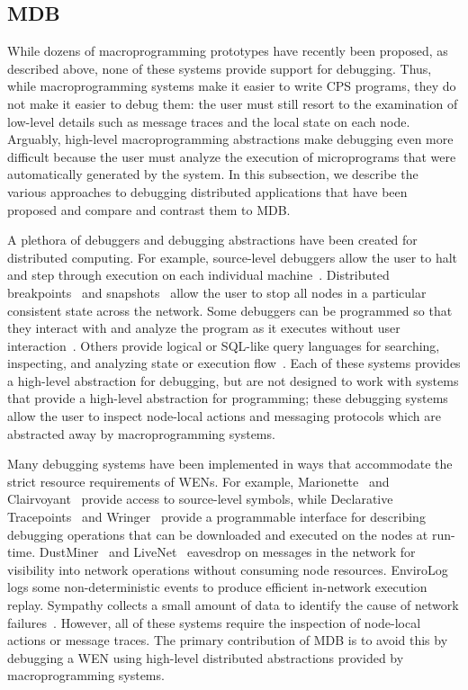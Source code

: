 \subsection{MDB}
While dozens of macroprogramming prototypes have recently been proposed, as
described above, none of these systems provide support for debugging.  Thus,
while macroprogramming systems make it easier to write CPS programs, they do not
make it easier to debug them: the user must still resort to the examination of
low-level details such as message traces and the local state on each node.
Arguably, high-level macroprogramming abstractions make debugging even more
difficult because the user must analyze the execution of microprograms that were
automatically generated by the system. In this subsection, we describe the
various approaches to debugging distributed applications that have been proposed
and compare and contrast them to MDB. 

A plethora of debuggers and debugging abstractions have been created for
distributed computing.  For example, source-level debuggers allow the user to
halt and step through execution on each individual
machine~\cite{Linton1990,Center1997,Browne2001}.  Distributed
breakpoints~\cite{Miller1988,Fowler1990,Garg1994} and
snapshots~\cite{Chandy1985} allow the user to stop all nodes in a particular
consistent state across the network.  Some debuggers can be programmed so that
they interact with and analyze the program as it executes without user
interaction~\cite{Golan1993,Maybee1992,Winterbottom1994}. Others provide logical
or SQL-like query languages for searching, inspecting, and analyzing state or
execution flow~\cite{Ducass'e1999,Powell1983,Lencevicius2003}.  Each of these
systems provides a high-level abstraction for debugging, but are not designed to
work with systems that provide a high-level abstraction for programming; these
debugging systems allow the user to inspect node-local actions and messaging
protocols which are abstracted away by macroprogramming systems.

Many debugging systems have been implemented in ways that accommodate the strict
resource requirements of WENs.  For example, Marionette~\cite{Whitehouseb} and
Clairvoyant~\cite{Yang2007} provide access to source-level symbols, while
Declarative Tracepoints~\cite{Cao2008} and Wringer~\cite{Tavakoli2008} provide a
programmable interface for describing debugging operations that can be
downloaded and executed on the nodes at run-time.  DustMiner~\cite{Khan2008} and
LiveNet~\cite{Chen2008} eavesdrop on messages in the network for visibility into
network operations without consuming node resources.  EnviroLog~\cite{Luo2006}
logs some non-deterministic events to produce efficient in-network execution
replay.  Sympathy collects a small amount of data to identify the cause of
network failures~\cite{Ramanathan2005}.  However, all of these systems require
the inspection of node-local actions or message traces.  The primary
contribution of MDB is to avoid this by debugging a WEN using high-level
distributed abstractions provided by macroprogramming systems.

